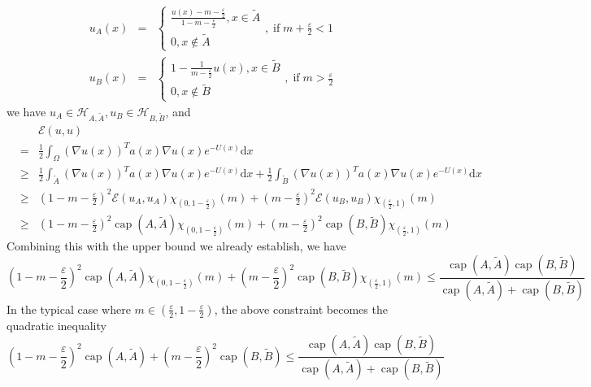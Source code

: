 \documentclass[english, aip, jcp, priprint, graphicx,floatfix]{revtex4-1}
\newcommand{\mathd}{\mathrm{d}}
\newcommand{\nin}{\not\in}
\newcommand{\tmop}[1]{\ensuremath{\operatorname{#1}}}
\theoremstyle{plain}
\theoremstyle{definition}
\theoremstyle{plain}
\begin{document}
\begin{eqnarray*}
u_A (x) & = & \left\{ \begin{array}{l}
\frac{u (x) - m - \frac{\varepsilon}{2}}{1 - m - \frac{\varepsilon}{2}}, x
\in \tilde{A}\\
0, x \nin \tilde{A}
\end{array} \right., \tmop{if} m + \frac{\varepsilon}{2} < 1\\
u_B (x) & = & \left\{ \begin{array}{l}
1 - \frac{1}{m - \frac{\varepsilon}{2}} u (x), x \in \tilde{B}\\
0, x \nin \tilde{B}
\end{array} \right., \tmop{if} m > \frac{\varepsilon}{2}
\end{eqnarray*}
we have $u_A \in \mathcal{H}_{A, \tilde{A}}, u_B \in \mathcal{H}_{B,
\tilde{B}}$, and
\begin{eqnarray*}
&  & \mathcal{E} (u, u)\\
& = & \frac{1}{2} \int_{\Omega} (\nabla u (x))^T a (x) \nabla u (x)
e^{- U (x)} \mathd x\\
& \geqslant & \frac{1}{2} \int_{\tilde{A}} (\nabla u (x))^T a (x) \nabla u
(x) e^{- U (x)} \mathd x + \frac{1}{2} \int_{\tilde{B}} (\nabla u (x))^T a
(x) \nabla u (x) e^{- U (x)} \mathd x\\
& \geqslant & \left( 1 - m - \frac{\varepsilon}{2} \right)^2 \mathcal{E}
(u_A, u_A) \chi_{\left( 0, 1 - \frac{\varepsilon}{2} \right)} (m) + \left( m
- \frac{\varepsilon}{2} \right)^2 \mathcal{E} (u_B, u_B) \chi_{\left(
\frac{\varepsilon}{2}, 1 \right)} (m)\\
& \geqslant & \left( 1 - m - \frac{\varepsilon}{2} \right)^2 \tmop{cap} (A,
\tilde{A}) \chi_{\left( 0, 1 - \frac{\varepsilon}{2} \right)} (m) + \left( m
- \frac{\varepsilon}{2} \right)^2 \tmop{cap} (B, \tilde{B}) \chi_{\left(
\frac{\varepsilon}{2}, 1 \right)} (m)
\end{eqnarray*}
Combining this with the upper bound we already establish, we have
\[ \left( 1 - m - \frac{\varepsilon}{2} \right)^2 \tmop{cap} (A, \tilde{A})
\chi_{\left( 0, 1 - \frac{\varepsilon}{2} \right)} (m) + \left( m -
\frac{\varepsilon}{2} \right)^2 \tmop{cap} (B, \tilde{B}) \chi_{\left(
\frac{\varepsilon}{2}, 1 \right)} (m) \leqslant \frac{\tmop{cap} (A,
\tilde{A}) \tmop{cap} (B, \tilde{B})}{\tmop{cap} (A, \tilde{A}) +
\tmop{cap} (B, \tilde{B})} \]
In the typical case where $m \in \left( \frac{\varepsilon}{2}, 1 - \frac{\varepsilon}{2} \right)$, the above constraint becomes the quadratic inequality
\[ \left( 1 - m - \frac{\varepsilon}{2} \right)^2 \tmop{cap} (A, \tilde{A}) +
\left( m - \frac{\varepsilon}{2} \right)^2 \tmop{cap} (B, \tilde{B})
\leqslant \frac{\tmop{cap} (A, \tilde{A}) \tmop{cap} (B,
\tilde{B})}{\tmop{cap} (A, \tilde{A}) + \tmop{cap} (B, \tilde{B})} \]
\end{document}
